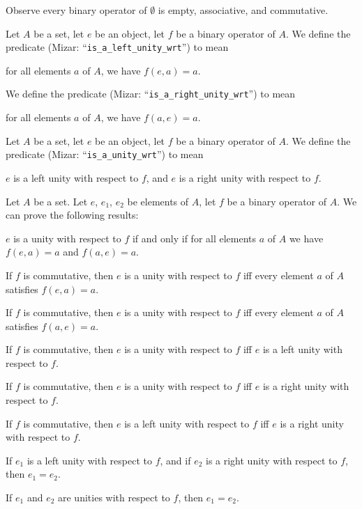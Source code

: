 \documentclass{article}
\begin{document}
Observe every binary operator of $\emptyset$ is empty, associative, and
commutative.

\begin{definition}
Let $A$ be a set, let $e$ be an object, let $f$ be a binary operator of
$A$.
We define the predicate 
(Mizar: ``\verb#is_a_left_unity_wrt#'') to mean
\begin{defn}
\item for all elements $a$ of $A$, we have $f(e,a)=a$.
\end{defn}
We define the predicate 
(Mizar: ``\verb#is_a_right_unity_wrt#'') to mean
\begin{defn}
\item for all elements $a$ of $A$, we have $f(a,e)=a$.
\end{defn}
\end{definition}

\begin{definition}
Let $A$ be a set, let $e$ be an object, let $f$ be a binary operator of $A$.
We define the predicate 
(Mizar: ``\verb#is_a_unity_wrt#'') to mean
\begin{defn}
\item $e$ is a left unity with respect to $f$, and $e$ is a right unity
  with respect to $f$.
\end{defn}
\end{definition}

Let $A$ be a set.
Let $e$, $e_{1}$, $e_{2}$ be elements of $A$,
let $f$ be a binary operator of $A$.
We can prove the following results:
\begin{thm}
\item\label{binop1:3} $e$ is a unity with respect to $f$ if and only if
  for all elements $a$ of $A$ we have $f(e,a)=a$ and $f(a,e)=a$.
\item\label{binop1:4} If $f$ is commutative,
  then $e$ is a unity with respect to $f$ iff every element $a$ of $A$
  satisfies $f(e,a)=a$.
\item\label{binop1:5} If $f$ is commutative,
  then $e$ is a unity with respect to $f$ iff every element $a$ of $A$
  satisfies $f(a,e)=a$.
\item\label{binop1:6} If $f$ is commutative,
  then $e$ is a unity with respect to $f$ iff $e$ is a left unity with
  respect to $f$.
\item\label{binop1:7} If $f$ is commutative,
  then $e$ is a unity with respect to $f$ iff $e$ is a right unity with
  respect to $f$.
\item\label{binop1:8} If $f$ is commutative,
  then $e$ is a left unity with respect to $f$ iff $e$ is a right unity with
  respect to $f$.
\item\label{binop1:9} If $e_{1}$ is a left unity with respect to $f$,
  and if $e_{2}$ is a right unity with respect to $f$, then $e_{1}=e_{2}$.
\item\label{binop1:10} If $e_{1}$ and $e_{2}$ are unities with respect
  to $f$, then $e_{1}=e_{2}$.
\end{thm}
\end{document}
